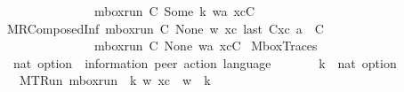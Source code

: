 \begin{isabellebody}
\ \ \ \ \ \ \ \ \ \ \ \ \ \ \ \ mbox{\isacharunderscore}{\kern0pt}run\ C{}\ {\isacharparenleft}{\kern0pt}Some\ k{\isacharparenright}{\kern0pt}\ {\isacharparenleft}{\kern0pt}w{\isasymsqdot}{\isacharbrackleft}{\kern0pt}a{\isacharbrackright}{\kern0pt}{\isacharparenright}{\kern0pt}\ {\isacharparenleft}{\kern0pt}xc{\isacharat}{\kern0pt}{\isacharbrackleft}{\kern0pt}C{\isacharbrackright}{\kern0pt}{\isacharparenright}{\kern0pt}{\isachardoublequoteclose}\ {\isacharbar}{\kern0pt}\isanewline
\ \ MRComposedInf{\isacharcolon}{\kern0pt}\ {\isachardoublequoteopen}{\isasymlbrakk}mbox{\isacharunderscore}{\kern0pt}run\ C{}\ None\ w\ xc{\isacharsemicolon}{\kern0pt}\ last\ {\isacharparenleft}{\kern0pt}C{}{\isacharhash}{\kern0pt}xc{\isacharparenright}{\kern0pt}\ {\isasymmidarrow}{\isasymlangle}a{\isacharcomma}{\kern0pt}\ {\isasyminfinity}{\isasymrangle}{\isasymrightarrow}\ C{\isasymrbrakk}\ {\isasymLongrightarrow}\isanewline
\ \ \ \ \ \ \ \ \ \ \ \ \ \ \ \ mbox{\isacharunderscore}{\kern0pt}run\ C{}\ None\ {\isacharparenleft}{\kern0pt}w{\isasymsqdot}{\isacharbrackleft}{\kern0pt}a{\isacharbrackright}{\kern0pt}{\isacharparenright}{\kern0pt}\ {\isacharparenleft}{\kern0pt}xc{\isacharat}{\kern0pt}{\isacharbrackleft}{\kern0pt}C{\isacharbrackright}{\kern0pt}{\isacharparenright}{\kern0pt}{\isachardoublequoteclose}\isanewline
\isanewline
%
\isanewline
{}\isamarkupfalse%
\ MboxTraces\isanewline
\ \ {\isacharcolon}{\kern0pt}{\isacharcolon}{\kern0pt}\ {\isachardoublequoteopen}nat\ option\ {\isasymRightarrow}\ {\isacharparenleft}{\kern0pt}{\isacharprime}{\kern0pt}information{\isacharcomma}{\kern0pt}\ {\isacharprime}{\kern0pt}peer{\isacharparenright}{\kern0pt}\ action\ language{\isachardoublequoteclose}\ \ {\isacharparenleft}{\kern0pt}{\isachardoublequoteopen}{\isasymT}\isactrlbsub {\isacharunderscore}{\kern0pt}\isactrlesub {\isachardoublequoteclose}\ {\isacharbrackleft}{\kern0pt}{}{}{}{\isacharbrackright}{\kern0pt}\ {}{}{}{\isacharparenright}{\kern0pt}\isanewline
\ \ \ k\ {\isacharcolon}{\kern0pt}{\isacharcolon}{\kern0pt}\ {\isachardoublequoteopen}nat\ option{\isachardoublequoteclose}\ \isanewline
\ \ \ \ MTRun{\isacharcolon}{\kern0pt}\ {\isachardoublequoteopen}mbox{\isacharunderscore}{\kern0pt}run\ {\isasymC}\isactrlsub {\isasymI}\isactrlsub {\isasymmm}\ k\ w\ xc\ {\isasymLongrightarrow}\ w\ {\isasymin}\ {\isasymT}\isactrlbsub k\isactrlesub {\isachardoublequoteclose}\isanewline

\end{isabellebody}
